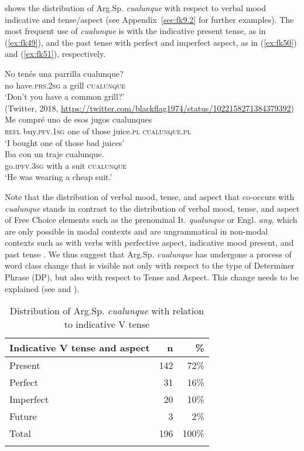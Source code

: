 \documentclass[output=paper,colorlinks,citecolor=brown]{langscibook}
\begin{document}
 shows the distribution of Arg.Sp. \textit{cualunque} with respect to verbal mood indicative and tense\slash aspect (see Appendix~\ref{sec:fk9.2} for further examples). The most frequent use of \textit{cualunque} is with the indicative present tense, as in (\ref{ex:fk49}), and the past tense with perfect and imperfect aspect, as in (\ref{ex:fk50}) and (\ref{ex:fk51}), respectively.\largerpage[2]

\ea\label{ex:fk49}
    \gll No tenés una parrilla cualunque?\\
    no have.\textsc{prs.2sg} a grill \textsc{cualunque}\\
    \glt ‘Don’t you have a common grill?’\\
    (Twitter, 2018, \url{https://twitter.com/blackflag1974/status/1022158271384379392})
\ex\label{ex:fk50}\citep{Marchetti2014}\\
    \gll Me compré uno de esos jugos cualunques\\
    \textsc{refl} buy.\textsc{pfv.1sg} one of those juice.\textsc{pl} \textsc{cualunque}.\textsc{pl}\\
    \glt ‘I bought one of those bad juices’
\ex\label{ex:fk51}\citep[][45]{LozzaPugliese1985}\\
    \gll Iba con un traje cualunque.\\
    go.\textsc{ipfv.3sg} with a suit \textsc{cualunque}\\
    \glt ‘He was wearing a cheap suit.’
\z

Note that the distribution of verbal mood, tense, and aspect that co-occurs with \textit{cualunque} stands in contrast to the distribution of verbal mood, tense, and aspect of Free Choice elements such as the prenominal It. \textit{qualunque} or Engl. \textit{any}, which are only possible in modal contexts and are ungrammatical in non-modal contexts such as with verbs with perfective aspect, indicative mood present, and past tense \citep[see][]{Quer2000, AloniPort2013, GiannakidouQuer2013, Kellert2021c}. We thus suggest that Arg.Sp. \textit{cualunque} has undergone a process of word class change that is visible not only with respect to the type of Determiner Phrase (DP), but also with respect to Tense and Aspect. This change needs to be explained (see   and ).

\begin{table}
    \begin{tabular}{lrr}
    \lsptoprule
       Indicative V tense and aspect      & n   & \% \\
    \midrule
       Present  & 142 & 72\% \\
       Perfect  & 31  & 16\% \\
       Imperfect & 20  & 10\% \\
       Future      & 3   & 2\% \\
    \midrule
       Total       & 196 & 100\% \\
    \lspbottomrule
    \end{tabular}
    \caption{Distribution of Arg.Sp. \textit{cualunque} with relation to indicative V tense}
    \label{tab:fk7}
\end{table}
\end{document}
